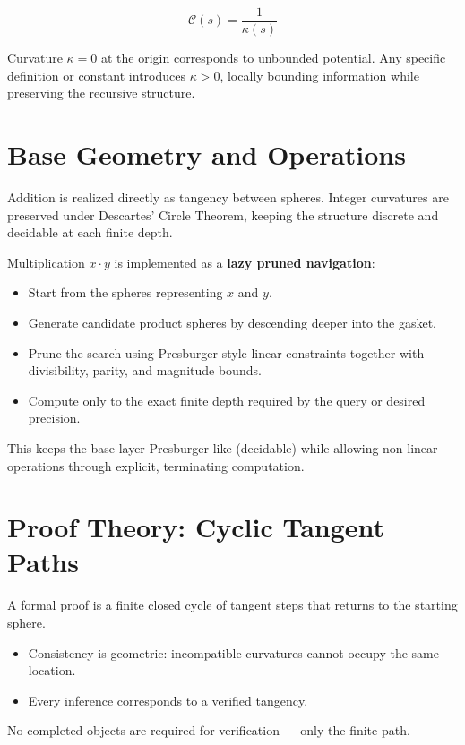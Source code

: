 \documentclass[11pt,oneside]{article}
\begin{document}
\begin{equation}
\mathcal{C}(s) = \frac{1}{\kappa(s)}
\end{equation}

Curvature \(\kappa = 0\) at the origin corresponds to unbounded potential. Any specific definition or constant introduces \(\kappa > 0\), locally bounding information while preserving the recursive structure.

\section{Base Geometry and Operations}
Addition is realized directly as tangency between spheres. Integer curvatures are preserved under Descartes' Circle Theorem, keeping the structure discrete and decidable at each finite depth.

Multiplication \(x \cdot y\) is implemented as a \textbf{lazy pruned navigation}:
\begin{itemize}
    \item Start from the spheres representing \(x\) and \(y\).
    \item Generate candidate product spheres by descending deeper into the gasket.
    \item Prune the search using Presburger-style linear constraints together with divisibility, parity, and magnitude bounds.
    \item Compute only to the exact finite depth required by the query or desired precision.
\end{itemize}

This keeps the base layer Presburger-like (decidable) while allowing non-linear operations through explicit, terminating computation.

\section{Proof Theory: Cyclic Tangent Paths}
A formal proof is a finite closed cycle of tangent steps that returns to the starting sphere.

\begin{itemize}
    \item Consistency is geometric: incompatible curvatures cannot occupy the same location.
    \item Every inference corresponds to a verified tangency.
\end{itemize}

No completed objects are required for verification — only the finite path.
\end{document}
